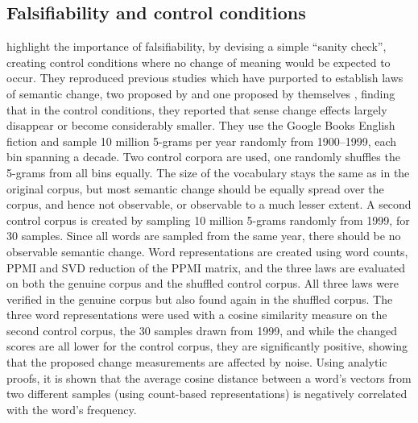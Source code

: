 \documentclass[output=paper]{langsci/langscibook}
\begin{document}
\subsection{Falsifiability and control conditions}\label{sec:falsifiability}

\citet{dubossarsky-etal-2017-outta} highlight the importance of falsifiability, 
by devising a simple ``sanity
check'', creating control conditions where no change of meaning
would be expected to occur. They reproduced previous studies which have purported to
establish laws of semantic change, two proposed by
\citet{hamilton-etal-2016-diachronic} and one proposed by themselves
\citep{dubossarsky2015bottom}, finding that in the control
conditions, they reported that sense change effects largely disappear or
become considerably smaller. They use the Google Books English fiction and sample 10 million 5-grams per year randomly from 1900--1999, each bin spanning a decade. Two control corpora are used, one randomly shuffles the 5-grams from all bins equally. The size of the vocabulary stays the same as in the original corpus, but most semantic change should be equally spread over the corpus, and hence not observable, or observable to a much lesser extent. A second control corpus is created by sampling 10 million 5-grams randomly from 1999, for 30 samples. Since all words are sampled from the same year, there should be no observable semantic change. Word representations are created using word counts, PPMI and SVD reduction of the PPMI matrix, and the three laws are evaluated on both the genuine corpus and the shuffled control corpus.  
%
All three laws were verified in the genuine corpus but also found again in the shuffled corpus. The three word representations were used with a cosine similarity measure on the second control corpus, the 30 samples drawn from 1999, and while the changed scores are all lower for the control corpus, they are significantly positive, showing that the proposed change measurements are affected by noise. Using analytic proofs, it is shown that the average cosine distance between a word's vectors from two different samples (using count-based representations) is negatively correlated with the word's frequency. 
\end{document}
